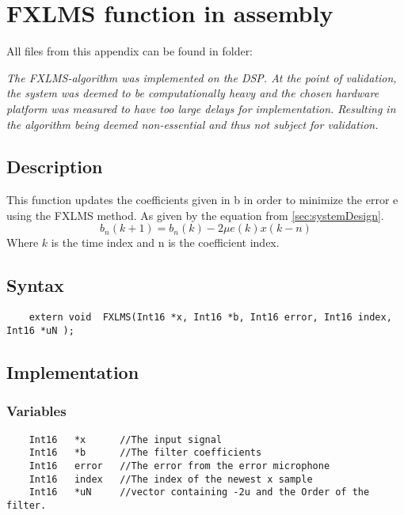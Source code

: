 
\section{FXLMS function in assembly}

All files from this appendix can be found in folder: \\

\textit{The FXLMS-algorithm was implemented on the DSP. At the point of validation, the system was deemed to be computationally heavy and the chosen hardware platform was measured to have too large delays for implementation. Resulting in the algorithm being deemed non-essential and thus not subject for validation.} 

\subsection{Description}
This function updates the coefficients given in b in order to minimize the error e using the FXLMS method. As given by the equation from \autoref{sec:systemDesign}.
\begin{equation}
	b_n(k+1)=b_n(k)-2\mu e(k)x(k-n)
\end{equation}
Where $k$ is the time index and n is the coefficient index.

\subsection{Syntax} 
\begin{lstlisting}
	extern void  FXLMS(Int16 *x, Int16 *b, Int16 error, Int16 index, Int16 *uN );
\end{lstlisting}

\subsection{Implementation}

\subsubsection{Variables}
\begin{lstlisting}
	Int16 	*x 		//The input signal
	Int16	*b		//The filter coefficients
	Int16	error	//The error from the error microphone
	Int16	index	//The index of the newest x sample
	Int16	*uN		//vector containing -2u and the Order of the filter.
\end{lstlisting}
\pagebreak

